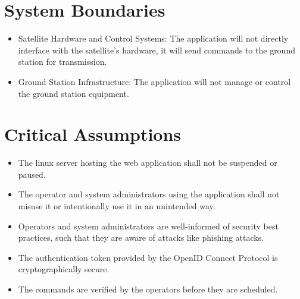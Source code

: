 \documentclass{article}
\begin{document}
\section{System Boundaries}
\begin{itemize}
    \item Satellite Hardware and Control Systems:
The application will not directly interface with the satellite’s hardware, it will send commands to the ground station for transmission.

\item Ground Station Infrastructure:
The application will not manage or control the ground station equipment.

\end{itemize}

\section{Critical Assumptions}

\begin{itemize}
\item The linux server hosting the web application shall not be suspended or paused.
\item The operator and system administrators using the application shall not misuse it or intentionally use it in an unintended way.
\item Operators and system administrators are well-informed of security best practices, such that they are aware of attacks like phishing attacks.
\item The authentication token provided by the OpenID Connect Protocol is cryptographically secure.
\item The commands are verified by the operators before they are scheduled.
\end{itemize}
\end{document}
